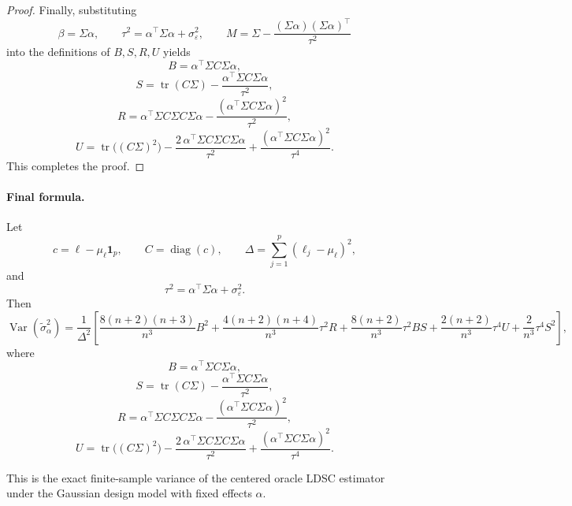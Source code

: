 \documentclass[11pt]{article}
\newcommand{\1}{\mathbf{1}}
\newcommand{\tr}{\operatorname{tr}}
\newcommand{\Var}{\operatorname{Var}}
\begin{document}
\begin{proof}
Finally, substituting
\[
\beta=\Sigma\alpha,\qquad
\tau^2=\alpha^\top\Sigma\alpha+\sigma_\varepsilon^2,\qquad
M=\Sigma-\frac{(\Sigma\alpha)(\Sigma\alpha)^\top}{\tau^2}
\]
into the definitions of \(B,S,R,U\) yields
\[
B=\alpha^\top\Sigma C\Sigma\alpha,
\]
\[
S=\tr(C\Sigma)-\frac{\alpha^\top\Sigma C\Sigma\alpha}{\tau^2},
\]
\[
R=
\alpha^\top\Sigma C\Sigma C\Sigma\alpha
-\frac{(\alpha^\top\Sigma C\Sigma\alpha)^2}{\tau^2},
\]
\[
U=
\tr\!\bigl((C\Sigma)^2\bigr)
-\frac{2\,\alpha^\top\Sigma C\Sigma C\Sigma\alpha}{\tau^2}
+\frac{(\alpha^\top\Sigma C\Sigma\alpha)^2}{\tau^4}.
\]
This completes the proof.
\end{proof}

\paragraph{Final formula.}
Let
\[
c=\ell-\mu_\ell\1_p,\qquad C=\operatorname{diag}(c),\qquad
\Delta=\sum_{j=1}^p(\ell_j-\mu_\ell)^2,
\]
and
\[
\tau^2=\alpha^\top\Sigma\alpha+\sigma_\varepsilon^2.
\]
Then
\[
\boxed{
\Var(\widetilde{\sigma}_\alpha^2)
=
\frac{1}{\Delta^2}
\left[
\frac{8(n+2)(n+3)}{n^3}B^2
+\frac{4(n+2)(n+4)}{n^3}\tau^2R
+\frac{8(n+2)}{n^3}\tau^2BS
+\frac{2(n+2)}{n^3}\tau^4U
+\frac{2}{n^3}\tau^4S^2
\right],
}
\]
where
\[
B=\alpha^\top\Sigma C\Sigma\alpha,
\]
\[
S=\tr(C\Sigma)-\frac{\alpha^\top\Sigma C\Sigma\alpha}{\tau^2},
\]
\[
R=
\alpha^\top\Sigma C\Sigma C\Sigma\alpha
-\frac{(\alpha^\top\Sigma C\Sigma\alpha)^2}{\tau^2},
\]
\[
U=
\tr\!\bigl((C\Sigma)^2\bigr)
-\frac{2\,\alpha^\top\Sigma C\Sigma C\Sigma\alpha}{\tau^2}
+\frac{(\alpha^\top\Sigma C\Sigma\alpha)^2}{\tau^4}.
\]

This is the exact finite-sample variance of the centered oracle LDSC estimator under the Gaussian design model with fixed effects \(\alpha\).
\end{document}
